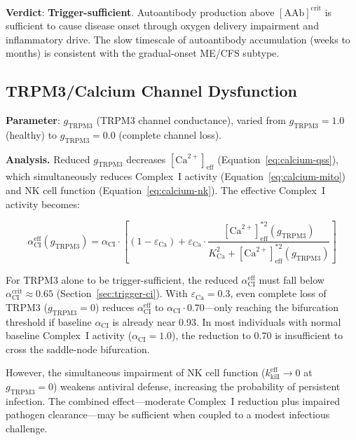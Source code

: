 \textbf{Verdict}: \textbf{Trigger-sufficient}. Autoantibody production above $[\text{AAb}]^{\mathrm{crit}}$ is sufficient to cause disease onset through oxygen delivery impairment and inflammatory drive. The slow timescale of autoantibody accumulation (weeks to months) is consistent with the gradual-onset ME/CFS subtype.

\subsection{TRPM3/Calcium Channel Dysfunction}
\label{sec:trigger-trpm3}

\textbf{Parameter}: $g_{\text{TRPM3}}$ (TRPM3 channel conductance), varied from $g_{\text{TRPM3}} = 1.0$ (healthy) to $g_{\text{TRPM3}} = 0.0$ (complete channel loss).

\textbf{Analysis.} Reduced $g_{\text{TRPM3}}$ decreases $[\text{Ca}^{2+}]_{\text{eff}}$ (Equation~\ref{eq:calcium-qss}), which simultaneously reduces Complex~I activity (Equation~\ref{eq:calcium-mito}) and NK cell function (Equation~\ref{eq:calcium-nk}). The effective Complex~I activity becomes:

\begin{equation}
\label{eq:ci-eff-trpm3}
\alpha_{\text{CI}}^{\text{eff}}(g_{\text{TRPM3}}) = \alpha_{\text{CI}} \cdot \left[(1 - \varepsilon_{\text{Ca}}) + \varepsilon_{\text{Ca}} \cdot \frac{[\text{Ca}^{2+}]_{\text{eff}}^{*2}(g_{\text{TRPM3}})}{K_{\text{Ca}}^2 + [\text{Ca}^{2+}]_{\text{eff}}^{*2}(g_{\text{TRPM3}})}\right]
\end{equation}

For TRPM3 alone to be trigger-sufficient, the reduced $\alpha_{\text{CI}}^{\text{eff}}$ must fall below $\alpha_{\text{CI}}^{\mathrm{crit}} \approx 0.65$ (Section~\ref{sec:trigger-ci}). With $\varepsilon_{\text{Ca}} = 0.3$, even complete loss of TRPM3 ($g_{\text{TRPM3}} = 0$) reduces $\alpha_{\text{CI}}^{\text{eff}}$ to $\alpha_{\text{CI}} \cdot 0.70$---only reaching the bifurcation threshold if baseline $\alpha_{\text{CI}}$ is already near 0.93. In most individuals with normal baseline Complex~I activity ($\alpha_{\text{CI}} = 1.0$), the reduction to $0.70$ is insufficient to cross the saddle-node bifurcation.

However, the simultaneous impairment of NK cell function ($k_{\text{kill}}^{\text{eff}} \to 0$ at $g_{\text{TRPM3}} = 0$) weakens antiviral defense, increasing the probability of persistent infection. The combined effect---moderate Complex~I reduction plus impaired pathogen clearance---may be sufficient when coupled to a modest infectious challenge.

